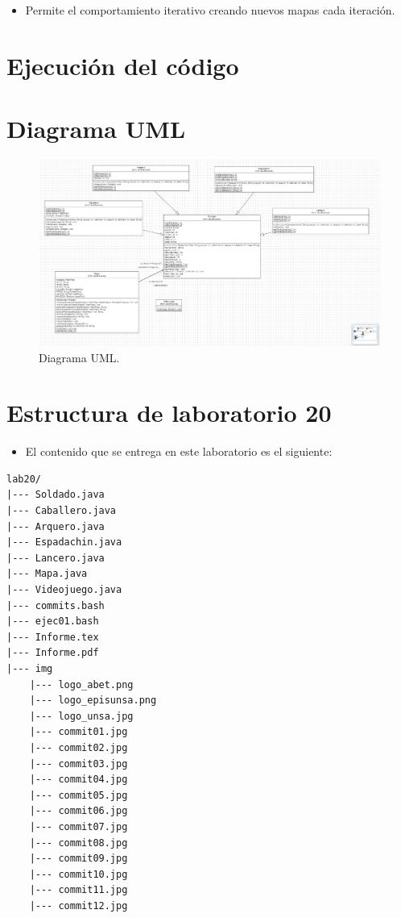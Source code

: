 \documentclass{article}
\newcommand{\itemPracticeNumber}{20}
\begin{document}

\begin{itemize}
	\item Permite el comportamiento iterativo creando nuevos mapas cada iteración.
\end{itemize}
\pagebreak

\section{Ejecución del código}

\pagebreak

\section{Diagrama UML}
\begin{figure}[H]
	\centering
	\includegraphics[width=1\textwidth,keepaspectratio]{img/uml.jpg}
	\caption{Diagrama UML.}
\end{figure}
\pagebreak

\section{Estructura de laboratorio \itemPracticeNumber}
\begin{itemize}
	\item El contenido que se entrega en este laboratorio es el siguiente:
\end{itemize}
\begin{lstlisting}[style=ascii-tree]
lab20/
|--- Soldado.java
|--- Caballero.java
|--- Arquero.java
|--- Espadachin.java
|--- Lancero.java
|--- Mapa.java
|--- Videojuego.java
|--- commits.bash
|--- ejec01.bash
|--- Informe.tex
|--- Informe.pdf
|--- img
	|--- logo_abet.png
	|--- logo_episunsa.png
	|--- logo_unsa.jpg
	|--- commit01.jpg
	|--- commit02.jpg
	|--- commit03.jpg
	|--- commit04.jpg
	|--- commit05.jpg
	|--- commit06.jpg
	|--- commit07.jpg
	|--- commit08.jpg
	|--- commit09.jpg
	|--- commit10.jpg
	|--- commit11.jpg
	|--- commit12.jpg
\end{lstlisting}
\pagebreak
\end{document}
